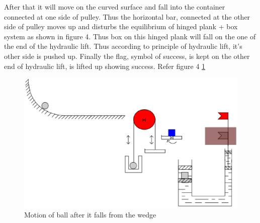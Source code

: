 \documentclass[a4paper,11pt]{article}
\begin{document}
{\indent After that it will move on the curved surface and fall into the container connected at one side of pulley.  
\indent Thus the horizontal bar, connected at the other side of pulley moves up and disturbs the equilibrium of hinged plank + box system as shown in figure 4. Thus box on this hinged plank will fall on the one of the end of the hydraulic lift. Thus according to principle of hydraulic lift, it's other side is pushed up. Finally the flag, symbol of success, is kept on the other end of hydraulic lift, is lifted up showing success. Refer figure 4 \ref{fig:image3}
\begin{figure}[h]
    \centering
    \label{fig:image3}
    \includegraphics[scale=0.3]{images/image3}
    \caption{Motion of ball after it falls from the wedge}
\end{figure}

}

\newpage
\end{document}
